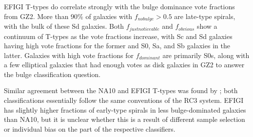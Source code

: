 \documentclass[useAMS,usenatbib]{mn2e}
\begin{document}
EFIGI T-types do correlate strongly with the bulge dominance vote fractions from GZ2. More than 90\% of galaxies with $f_{no bulge}>0.5$ are late-type spirals, with the bulk of these Sd galaxies. Both $f_{just noticeable}$ and $f_{obvious}$ show a continuum of T-types as the vote fractions increase, with Sc and Sd galaxies having high vote fractions for the former and S0, Sa, and Sb galaxies in the latter. Galaxies with high vote fractions for $f_{dominant}$ are primarily S0s, along with a few elliptical galaxies that had enough votes as disk galaxies in GZ2 to answer the bulge classification question. 

Similar agreement between the NA10 and EFIGI T-types was found by \citet{bai11}; both classifications essentially follow the same conventions of the RC3 system. EFIGI has slightly higher fractions of early-type spirals in less bulge-dominated galaxies than NA10, but it is unclear whether this is a result of different sample selection or individual bias on the part of the respective classifiers.

%
%
%
%
\end{document}
